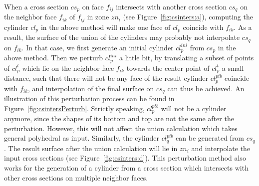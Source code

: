 When a cross section $cs_p$ on face $f_{ij}$  intersects with
another cross section $cs_q$ on the neighbor face $f_{ik}$ of
$f_{ij}$ in zone $zn_i$ (see Figure~\ref{fig:csinters:a}), computing
the cylinder $cl_p$ in the above method will make one face of $cl_p$
coincide with $f_{ik}$. As a result, the surface of the union of the
cylinders may probably not interpolate $cs_q$ on $f_{ik}$. In that
case, we first generate an initial cylinder $cl_p^{ini}$ from $cs_p$
in the above method. Then we perturb $cl_p^{ini}$ a little bit, by
translating a subset of points of $cl_p^t$ which lie on the neighbor
face $f_{ik}$ towards the center point of $cl_p^t$ a small distance,
such that there will not be any face of the result cylinder
$cl_p^{ptb}$ coincide with $f_{ik}$, and interpolation of the final
surface on $cs_q$ can thus be achieved. An illustration of this perturbation
process can be found in Figure~\ref{fig:csintersPerturb}. Strictly speaking,
$cl_p^{ptb}$ will not be a cylinder anymore, since the shapes of its
bottom and top are not the same after the perturbation. However,
this will not affect the union calculation which takes general
polyhedral as input. Similarly, the cylinder $cl_q^{ptb}$ can be
generated from $cs_q$. The result surface after the union
calculation will lie in $zn_i$ and interpolate the input cross
sections (see Figure~\ref{fig:csinters:d}). This perturbation method
also works for the generation of a cylinder from a cross section
which intersects with other cross sections on multiple neighbor
faces.

